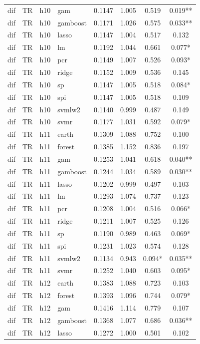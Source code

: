 \begin{ThreePartTable}
\begin{longtable}[t]{llclcccc}
dif & TR & h10 & gam & 0.1147 & 1.005 & 0.519 & 0.019**\\
dif & TR & h10 & gamboost & 0.1171 & 1.026 & 0.575 & 0.033**\\
dif & TR & h10 & lasso & 0.1147 & 1.004 & 0.517 & 0.132\\
dif & TR & h10 & lm & 0.1192 & 1.044 & 0.661 & 0.077*\\
dif & TR & h10 & pcr & 0.1149 & 1.007 & 0.526 & 0.093*\\
dif & TR & h10 & ridge & 0.1152 & 1.009 & 0.536 & 0.145\\
dif & TR & h10 & sp & 0.1147 & 1.005 & 0.518 & 0.084*\\
dif & TR & h10 & spi & 0.1147 & 1.005 & 0.518 & 0.109\\
dif & TR & h10 & svmlw2 & 0.1140 & 0.999 & 0.487 & 0.149\\
dif & TR & h10 & svmr & 0.1177 & 1.031 & 0.592 & 0.079*\\
\addlinespace
dif & TR & h11 & earth & 0.1309 & 1.088 & 0.752 & 0.100\\
dif & TR & h11 & forest & 0.1385 & 1.152 & 0.836 & 0.197\\
dif & TR & h11 & gam & 0.1253 & 1.041 & 0.618 & 0.040**\\
dif & TR & h11 & gamboost & 0.1244 & 1.034 & 0.589 & 0.030**\\
dif & TR & h11 & lasso & 0.1202 & 0.999 & 0.497 & 0.103\\
dif & TR & h11 & lm & 0.1293 & 1.074 & 0.737 & 0.123\\
dif & TR & h11 & pcr & 0.1208 & 1.004 & 0.516 & 0.066*\\
dif & TR & h11 & ridge & 0.1211 & 1.007 & 0.525 & 0.126\\
dif & TR & h11 & sp & 0.1190 & 0.989 & 0.463 & 0.069*\\
dif & TR & h11 & spi & 0.1231 & 1.023 & 0.574 & 0.128\\
dif & TR & h11 & svmlw2 & 0.1134 & 0.943 & 0.094* & 0.035**\\
dif & TR & h11 & svmr & 0.1252 & 1.040 & 0.603 & 0.095*\\
\addlinespace
dif & TR & h12 & earth & 0.1383 & 1.088 & 0.723 & 0.103\\
dif & TR & h12 & forest & 0.1393 & 1.096 & 0.744 & 0.079*\\
dif & TR & h12 & gam & 0.1416 & 1.114 & 0.779 & 0.107\\
dif & TR & h12 & gamboost & 0.1368 & 1.077 & 0.686 & 0.036**\\
dif & TR & h12 & lasso & 0.1272 & 1.000 & 0.501 & 0.102\\

\end{longtable}
\end{ThreePartTable}
